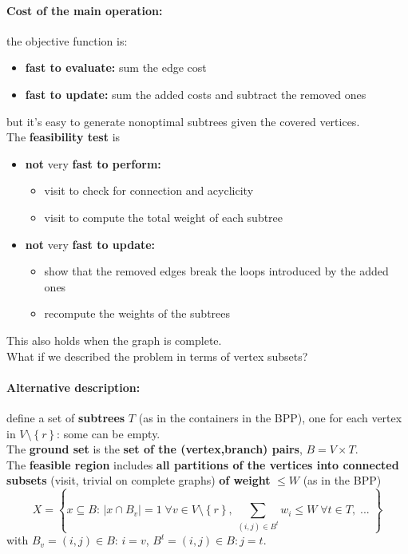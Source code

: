 \documentclass[11pt]{article}
\begin{document}
	\paragraph{Cost of the main operation:} the objective function is:
	\begin{itemize}
		\item \textbf{fast to evaluate:} sum the edge cost
		\item \textbf{fast to update:} sum the added costs and subtract the removed ones
	\end{itemize}
	but it's easy to generate nonoptimal subtrees given the covered vertices.\\
	
	The \textbf{feasibility test} is
	\begin{itemize}
		\item \textbf{not} very \textbf{fast to perform:} 
		\begin{itemize}
			\item visit to check for connection and acyclicity
			\item visit to compute the total weight of each subtree
		\end{itemize}
		\item \textbf{not} very \textbf{fast to update:} 
		\begin{itemize}
			\item show that the removed edges break the loops introduced by the added ones
			\item recompute the weights of the subtrees
		\end{itemize}
	\end{itemize}
	This also holds when the graph is complete.\\
	
	What if we described the problem in terms of vertex subsets?
	
	\newpage
	
	\paragraph{Alternative description:} define a set of \textbf{subtrees} $T$ (as in the containers in the BPP), one for each vertex in $V \setminus \left\{r\right\}$: some can be empty.\\
	
	The \textbf{ground set} is the \textbf{set of the (vertex,branch) pairs}, $B = V \times T$.\\
	
	The \textbf{feasible region} includes \textbf{all partitions of the vertices into connected subsets} (visit, trivial on complete graphs) \textbf{of weight} $\leq W$ (as in the BPP)
	$$ X = \left\{x \subseteq B : \, |x \cap B_v| = 1 \; \forall v \in V \setminus \left\{r\right\}, \, \sum_{(i,j)\in B^t} w_i \leq W \; \forall t \in T, \; ... \; \right\}$$
	with $B_v = {(i, j) \in B : \, i = v }$, $B^t = {(i, j) \in B : j = t}$.\\
	
\end{document}
